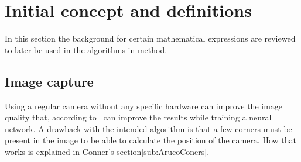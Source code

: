 \section{Initial concept and definitions}\label{sec:background}


In this section the background for certain mathematical expressions are reviewed to later be used in the algorithms in method.



\subsection{Image capture}%
\label{sub:Image_capture}
Using a regular camera without any specific hardware can improve the image quality that, according to~\cite{jeelani2018image} can improve the results while training a neural network.
A drawback with the intended algorithm is that a few \aruco{} corners must be present in the image to be able to calculate the position of the camera.
How that works is explained in \aruco{} Conner's section\ref{sub:ArucoConers}.


